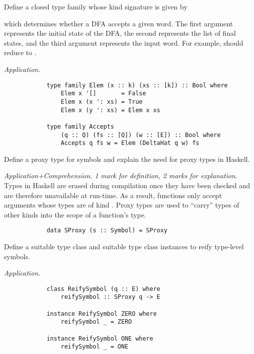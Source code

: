 \begin{parts}
\begin{subparts}
		\ifprintanswers \else \pagebreak \fi
	
		\subpart[8] Define a closed type family whose kind signature is given by 
		\begin{center}
		\end{center}
		which determines whether a DFA accepts a given word. The first argument represents the initial state of the DFA, the second represents the list of final states, and the third argument represents the input word. For example,  should reduce to .
		\droppoints 
		
		\begin{solution}
			\emph{Application.}
			\begin{verbatim}
			type family Elem (x :: k) (xs :: [k]) :: Bool where 
			    Elem x '[]       = False 
			    Elem x (x ': xs) = True 
			    Elem x (y ': xs) = Elem x xs
			
			type family Accepts 
			    (q :: Q) (fs :: [Q]) (w :: [E]) :: Bool where 
			    Accepts q fs w = Elem (DeltaHat q w) fs
			\end{verbatim}
		\end{solution}
		
		\subpart[3] Define a proxy type for symbols and explain the need for proxy types in Haskell. \droppoints 
		
		\begin{solution}
			\emph{Application+Comprehension. 1 mark for definition, 2 marks for explanation.} Types in Haskell are erased during compilation once they have been checked and are therefore unavailable at run-time. As a result, functions only accept arguments whose types are of kind \haskellIn{*}. Proxy types are used to ``carry'' types of other kinds into the scope of a function's type.
			
			\begin{verbatim}
			data SProxy (s :: Symbol) = SProxy
			\end{verbatim}
		\end{solution}
		
		\subpart[4] Define a suitable type class and suitable type class instances to reify type-level symbols. \droppoints 
		
		\begin{solution}
			\emph{Application.} 
			\begin{verbatim}
			class ReifySymbol (q :: E) where 
			    reifySymbol :: SProxy q -> E
			
			instance ReifySymbol ZERO where 
			    reifySymbol _ = ZERO 
			
			instance ReifySymbol ONE where 
			    reifySymbol _ = ONE
			\end{verbatim}
		\end{solution}
		
	\end{subparts}
\end{parts}
